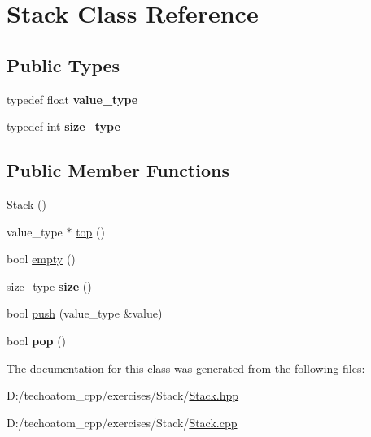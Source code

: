 \hypertarget{class_stack}{}\section{Stack Class Reference}
\label{class_stack}
\subsection*{Public Types}
\begin{DoxyCompactItemize}
\item 
\mbox{\label{class_stack_a68b3e06034e7378c4f172aa6f3e75ed0}} 
typedef float {\bfseries value\+\_\+type}
\item 
\mbox{\label{class_stack_a032e6aab283e546a5521edee26373f71}} 
typedef int {\bfseries size\+\_\+type}
\end{DoxyCompactItemize}
\subsection*{Public Member Functions}
\begin{DoxyCompactItemize}
\item 
\mbox{\label{class_stack_a14cd1cba325bead4ff0a91bc6eb0f6f5}} 
\hyperlink{class_stack_a14cd1cba325bead4ff0a91bc6eb0f6f5}{Stack} ()
\item 
\mbox{\label{class_stack_abd7b81f829766af0027065a607368fea}} 
value\+\_\+type $\ast$ \hyperlink{class_stack_abd7b81f829766af0027065a607368fea}{top} ()
\item 
\mbox{\label{class_stack_aa684687dcf8f4534369955756ebe048e}} 
bool \hyperlink{class_stack_aa684687dcf8f4534369955756ebe048e}{empty} ()
\item 
\mbox{\label{class_stack_a5f5e3404e3d8f085567136a3a90a864a}} 
size\+\_\+type {\bfseries size} ()
\item 
\mbox{\label{class_stack_adae42d26739e374e6e59612445dfe8bd}} 
bool \hyperlink{class_stack_adae42d26739e374e6e59612445dfe8bd}{push} (value\+\_\+type \&value)
\item 
\mbox{\label{class_stack_a9ace01ff7a826516656db5051b3c14b9}} 
bool {\bfseries pop} ()
\end{DoxyCompactItemize}


The documentation for this class was generated from the following files\+:\begin{DoxyCompactItemize}
\item 
D\+:/techoatom\+\_\+cpp/exercises/\+Stack/\hyperlink{_stack_8hpp}{Stack.\+hpp}\item 
D\+:/techoatom\+\_\+cpp/exercises/\+Stack/\hyperlink{_stack_8cpp}{Stack.\+cpp}\end{DoxyCompactItemize}
